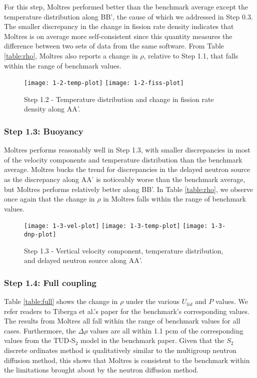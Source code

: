 For this step, Moltres performed better than the benchmark average except
the temperature distribution along BB', the cause of which we
addressed in Step 0.3. The smaller discrepancy in the change in fission rate
density indicates that Moltres is on average more self-consistent since this
quantity measures the difference between two sets of data from the same
software. From Table \ref{table:rho}, Moltres also reports a change in $\rho$,
relative to Step 1.1, that falls within the range of benchmark values.
%
\begin{figure*}[h!]
	\centering
	\texttt{[image: 1-2-temp-plot]}
	\texttt{[image: 1-2-fiss-plot]}
	\caption{Step 1.2 - Temperature distribution and change in fission rate
	density along AA'.}
	\label{fig:1.2}
\end{figure*}

\subsubsection{Step 1.3: Buoyancy}

Moltres performs reasonably well in Step 1.3, with smaller
discrepancies in most of the velocity components and temperature distribution
than the benchmark average. Moltres bucks the trend for discrepancies
in the delayed neutron source as the discrepancy along AA' is
noticeably worse than the benchmark average, but Moltres performs relatively
better along BB'. In Table \ref{table:rho}, we observe once again that the
change in $\rho$ in Moltres falls within the range of benchmark values.
%
\begin{figure*}[h!]
	\centering
	\texttt{[image: 1-3-vel-plot]}
	\texttt{[image: 1-3-temp-plot]}
	\texttt{[image: 1-3-dnp-plot]}
	\caption{Step 1.3 - Vertical velocity component, temperature distribution,
	and delayed neutron source along AA'.}
	\label{fig:1.3}
\end{figure*}

\subsubsection{Step 1.4: Full coupling}

Table \ref{table:full} shows the change in $\rho$ under the various $U_{lid}$
and $P$ values. We refer readers to Tiberga et al.'s paper
\citep{tiberga_results_2020} for the benchmark's corresponding values.
The results from Moltres all fall within the range of benchmark values for all
cases. Furthermore, the $\Delta\rho$ values are all within 1.1 pcm of the
corresponding values from the TUD-S$_2$ model in the benchmark paper. Given
that the $S_2$ discrete ordinates method is qualitatively similar to the
multigroup neutron diffusion method, this shows that Moltres is
consistent to the benchmark within the limitations brought about by the neutron
diffusion method.

